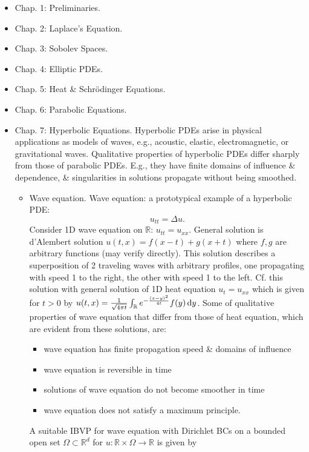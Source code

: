 \documentclass{article}
\begin{document}
\begin{enumerate}
	\begin{itemize}
		\item {\sf Chap. 1: Preliminaries.}
		\item {\sf Chap. 2: Laplace's Equation.}
		\item {\sf Chap. 3: Sobolev Spaces.}
		\item {\sf Chap. 4: Elliptic PDEs.}
		\item {\sf Chap. 5: Heat \& Schr\"odinger Equations.}
		\item {\sf Chap. 6: Parabolic Equations.}
		\item {\sf Chap. 7: Hyperbolic Equations.} Hyperbolic PDEs arise in physical applications as models of waves, e.g., acoustic, elastic, electromagnetic, or gravitational waves. Qualitative properties of hyperbolic PDEs differ sharply from those of parabolic PDEs. E.g., they have finite domains of influence \& dependence, \& singularities in solutions propagate without being smoothed.
		\begin{itemize}
			\item {\sf Wave equation.} Wave equation: a prototypical example of a hyperbolic PDE:
			\begin{equation}
				\label{wave}
				u_{tt} = \Delta u.
			\end{equation}
			Consider 1D wave equation on $\mathbb{R}$: $u_{tt} = u_{xx}$. General solution is d'Alembert solution $u(t,x) = f(x - t) + g(x + t)$ where $f,g$ are arbitrary functions (may verify directly). This solution describes a superposition of 2 traveling waves with arbitrary profiles, one propagating with speed 1 to the right, the other with speed 1 to the left. Cf. this solution with general solution of 1D heat equation $u_t = u_{xx}$ which is given for $t > 0$ by $u(t,x) = \frac{1}{\sqrt{4\pi t}}\int_\mathbb{R} e^{-\frac{(x - y)^2}{4t}}f(y)\,{\rm d}y$. Some of qualitative properties of wave equation that differ from those of heat equation, which are evident from these solutions, are:
			\begin{itemize}
				\item wave equation has finite propagation speed \& domains of influence
				\item wave equation is reversible in time
				\item solutions of wave equation do not become smoother in time
				\item wave equation does not satisfy a maximum principle.
			\end{itemize}
			A suitable IBVP for wave equation with Dirichlet BCs on a bounded open set $\Omega\subset\mathbb{R}^d$ for $u:\mathbb{R}\times\Omega\to\mathbb{R}$ is given by

\end{itemize}
\end{itemize}
\end{enumerate}
\end{document}
